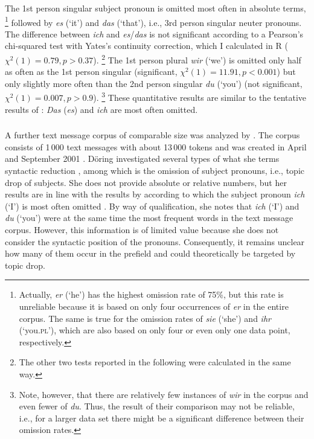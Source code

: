\noindent
The 1st person singular subject pronoun is omitted most often in absolute terms,%
\footnote{Actually, \textit{er} (`he') has the highest omission rate of 75\%, but this rate is unreliable because it is based on only four occurrences of \textit{er} in the entire corpus.
The same is true for the omission rates of \textit{sie} (`she') and \textit{ihr} (`you.\textsc{pl}'), which are also based on only four or even only one data point, respectively.} %
%
followed by \textit{es} (`it') and \textit{das} (`that'), i.e., 3rd person singular neuter pronouns. 
The difference between \textit{ich} and \textit{es}/\textit{das} is not significant according to a Pearson's chi-squared test with Yates's continuity correction, which I calculated in R \citep{rcoreteam2021} ($\chi^2(1) = 0.79, p > 0.37$).%
\footnote{The other two tests reported in the following were calculated in the same way.}
%
The 1st person plural \textit{wir} (`we') is omitted only half as often as the 1st person singular (significant, $\chi^2(1) = 11.91, p < 0.001$) but only slightly more often than the 2nd person singular \textit{du} (`you') (not significant, $\chi^2(1) = 0.007, p > 0.9$).%
\footnote{Note, however, that there are relatively few instances of \textit{wir} in the corpus and even fewer of \textit{du}.
Thus, the result of their comparison may not be reliable, i.e., for a larger data set there might be a significant difference between their omission rates.}
These quantitative results are similar to the tentative results of \citet{auer1993}:
\textit{Das} (\textit{es}) and \textit{ich} are most often omitted. 

\subsubsection{\citet{doring2002}} A further text message corpus of comparable size was analyzed by \citet{doring2002}.
The corpus consists of 1\,000  text messages with about 13\,000 tokens and was created in April and September 2001 \citep[102]{doring2002}.
Döring investigated several types of what she terms syntactic reduction \citep[105]{doring2002}, among which is the omission of subject pronouns, i.e., topic drop of subjects.
She does not provide absolute or relative numbers, but her results are in line with the results by \citet{androutsopoulos.schmidt2002} according to which the subject pronoun \textit{ich} (`I') is most often omitted \citep[107]{doring2002}.
By way of qualification, she notes that \textit{ich} (`I') and \textit{du} (`you') were at the same time the most frequent words in the text message corpus.
However, this information is of limited value because she does not consider the syntactic position of the pronouns.
Consequently, it remains unclear how many of them occur in the prefield and could theoretically be targeted by topic drop.

